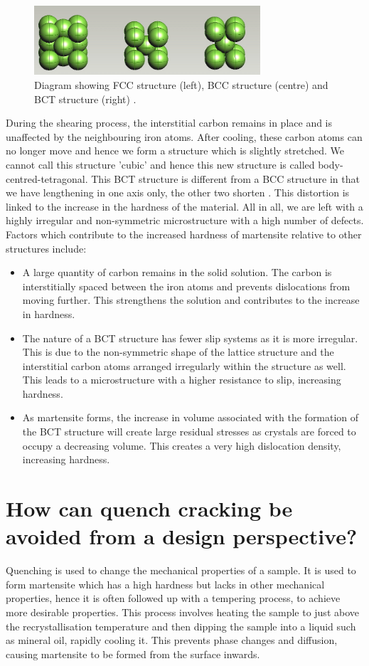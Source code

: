 \documentclass[11pt]{article}
\begin{document}
\begin{figure}[H]
    \centering
    \includegraphics[width = 0.75\textwidth]{./img/q3a.jpg}
    \caption{Diagram showing FCC structure (left), BCC structure (centre) and BCT structure (right) \cite{b3}.}
\end{figure}
During the shearing process, the interstitial carbon remains in place and is unaffected by the neighbouring iron atoms. After cooling, these carbon atoms can no longer move and hence we form a structure which is slightly stretched. We cannot call this structure 'cubic' and hence this new structure is called body-centred-tetragonal. This BCT structure is different from a BCC structure in that we have lengthening in one axis only, the other two shorten \cite{b2}. This distortion is linked to the increase in the hardness of the material. All in all, we are left with a highly irregular and non-symmetric microstructure with a high number of defects. Factors which contribute to the increased hardness of martensite relative to other structures include:
\begin{itemize}
    \item A large quantity of carbon remains in the solid solution. The carbon is interstitially spaced between the iron atoms and prevents dislocations from moving further. This strengthens the solution and contributes to the increase in hardness.
    \item The nature of a BCT structure has fewer slip systems as it is more irregular. This is due to the non-symmetric shape of the lattice structure and the interstitial carbon atoms arranged irregularly within the structure as well. This leads to a microstructure with a higher resistance to slip, increasing hardness.
    \item As martensite forms, the increase in volume associated with the formation of the BCT structure will create large residual stresses as crystals are forced to occupy a decreasing volume. This creates a very high dislocation density, increasing hardness.
\end{itemize}
\section{How can quench cracking be avoided from a design perspective?}
Quenching is used to change the mechanical properties of a sample. It is used to form martensite which has a high hardness but lacks in other mechanical properties, hence it is often followed up with a tempering process, to achieve more desirable properties. This process involves heating the sample to just above the recrystallisation temperature and then dipping the sample into a liquid such as mineral oil, rapidly cooling it. This prevents phase changes and diffusion, causing martensite to be formed from the surface inwards. 
\end{document}
